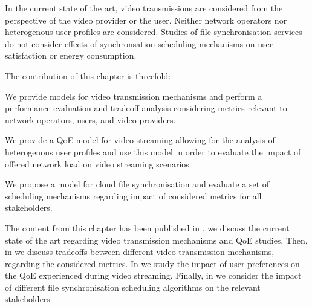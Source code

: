 In the current state of the art, video transmissions are considered from the perspective of the video provider or the user. 
Neither network operators nor heterogenous user profiles are considered.
Studies of file synchronisation services do not consider effects of synchronsation scheduling mechanisms on user satisfaction or energy consumption.  

The contribution of this chapter is threefold:
\begin{enumerate*}
\item We provide models for video transmission mechanisms and perform a performance evaluation and tradeoff analysis considering metrics relevant to network operators, users, and video providers.
\item We provide a \gls{QoE} model for video streaming allowing for the analysis of heterogenous user profiles and use this model in order to evaluate the impact of offered network load on video streaming scenarios.
\item We propose a model for cloud file synchronisation and evaluate a set of scheduling mechanisms regarding impact of considered metrics for all stakeholders.
\end{enumerate*}

The content from this chapter has been published in \cite{Schwartz2013b, Hossfeld2015, Schwartz2014a}.
 we discuss the current state of the art regarding video transmission mechanisms and \gls{QoE} studies.
Then, in  we discuss tradeoffs between different video transmission mechanisms, regarding the considered metrics.
In  we study the impact of user preferences on the \gls{QoE} experienced during video streaming.
Finally, in  we consider the impact of different file synchronisation scheduling algorithms on the relevant stakeholders.





